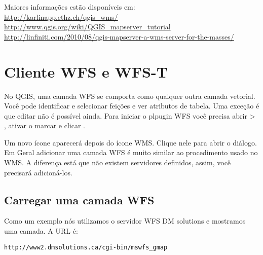 Maiores informações estão disponíveis em: \\
\url{http://karlinapp.ethz.ch/qgis\_wms/} \\
\url{http://www.qgis.org/wiki/QGIS\_mapserver\_tutorial} \\
\url{http://linfiniti.com/2010/08/qgis-mapserver-a-wms-server-for-the-masses/}



%
%
\section{Cliente WFS e WFS-T}\label{sec:ogc-wfs}

No QGIS, uma camada WFS se comporta como qualquer outra camada vetorial. Você pode identificar e selecionar feições e ver atributos de tabela. Uma exceção é que editar não é possível ainda. Para iniciar o plpugin WFS você precisa abrir  > 
, ativar o 
 marcar e clicar . 

Um novo ícone  aparecerá depois do ícone WMS. Clique nele para abrir o diálogo. Em Geral adicionar uma camada WFS é muito similar ao procedimento usado no WMS. A diferença está que não existem servidores definidos, assim, você precisará adicioná-los.

\subsection{Carregar uma camada WFS}

Como um exemplo nós utilizamos o servidor WFS DM solutions e mostramos uma camada. A URL é:
\begin{verbatim}
http://www2.dmsolutions.ca/cgi-bin/mswfs_gmap
\end{verbatim}

